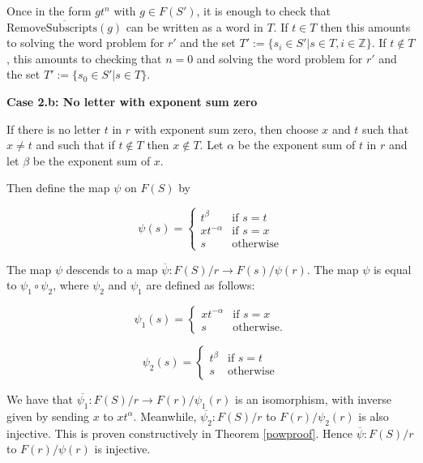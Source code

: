 \documentclass[12pt]{article} %
\theoremstyle{definition}
\theoremstyle{definition}
\theoremstyle{definition}
\theoremstyle{definition}
\theoremstyle{definition}
\theoremstyle{definition}
\begin{document}
Once in the form $g t^n$ with $g \in F(S')$, it is enough to check that
$\overline{\text{RemoveSubscripts}(g)}$ can be written as a word in $T$.
If $t \in T$ then this amounts to solving the word problem for $r'$
and the set $T' := \{ s_i \in S' | s \in T, i \in \mathbb{Z} \}$. If $t \notin T$,
this amounts to checking that $n = 0$ and solving the word problem for
$r'$ and the set $T' := \{s_0 \in S' | s \in T\}$.

\textbf{Case 2.b: No letter with exponent sum zero}\label{noexpsumzero}

If there is no letter $t$ in $r$ with exponent sum zero, then choose $x$
and $t$ such that $x \ne t$ and such that if $t \notin T$ then $x \notin T$.
Let $\alpha$ be the exponent sum
of $t$ in $r$ and let $\beta$ be the exponent sum of $x$.

Then define the map $\psi$ on $F(S)$ by

\begin{equation}
  \psi(s) =
  \begin{cases}
     t^\beta & \text{if }s = t \\
     xt^{-\alpha} &\text{if } s = x \\
     s & \text{otherwise}
  \end{cases}
\end{equation}

The map $\psi$ descends to a map $\overline{\psi}: F(S) / r \to F(s) / \psi(r)$. The map
$\psi$ is equal to $\psi_1 \circ \psi_2$,
where $\psi_2$ and $\psi_1$ are defined as follows:

\begin{equation}
  \psi_1(s) =
  \begin{cases}
     xt^{-\alpha} &\text{if } s = x \\
     s & \text{otherwise.}
  \end{cases}
\end{equation}

\begin{equation}
  \psi_2(s) =
  \begin{cases}
     t^\beta & \text{if } s = t \\
     s & \text{otherwise}
  \end{cases}
\end{equation}

We have that $\overline{\psi_1}: F(S) / r \to F(r) / \psi_1(r)$ is an isomorphism, with inverse given by sending $x$ to $xt^\alpha$. Meanwhile,
$\overline{\psi_2}: F(S) / r$ to $F(r) / \psi_2(r)$
is also injective.
This is proven constructively in Theorem \ref{powproof}.
Hence $\overline{\psi}: F(S) / r$ to $F(r) / \psi(r)$ is injective.
\end{document}
